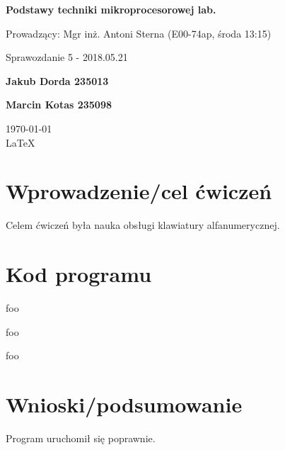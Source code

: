 \documentclass[12pt,a4paper]{article}
\begin{document}
	
	\begin{titlepage}
		
		\centering
		{\huge\bfseries Podstawy techniki mikroprocesorowej lab.\par}
		
		\vspace{0.5cm}
		Prowadzący: Mgr inż. Antoni Sterna (E00-74ap, środa 13:15) \\
	
		\vspace{1.1cm}
		{\Large Sprawozdanie 5 - 2018.05.21\par}
		\vfill
		
		{\large\bfseries Jakub Dorda 235013\par}
		{\large\bfseries Marcin Kotas 235098\par}
		
		\vspace{1cm}
		\today \\ \LaTeX
		
		\restoregeometry
	\end{titlepage}


	\section{Wprowadzenie/cel ćwiczeń}
		Celem ćwiczeń była nauka obsługi klawiatury alfanumerycznej.
		
	\section{Kod programu}
		\begin{minipage}{.5\textwidth}
			
		\end{minipage}%
		\begin{minipage}{.5\textwidth}
			foo
		\end{minipage}
		
		\begin{minipage}{.5\textwidth}
			
		\end{minipage}%
		\begin{minipage}{.5\textwidth}
			foo
		\end{minipage}
		
		\begin{minipage}{.5\textwidth}
			
		\end{minipage}%
		\begin{minipage}{.5\textwidth}
			foo
		\end{minipage}
		
	\section{Wnioski/podsumowanie}
	
			Program uruchomił się poprawnie.
	
\end{document}
